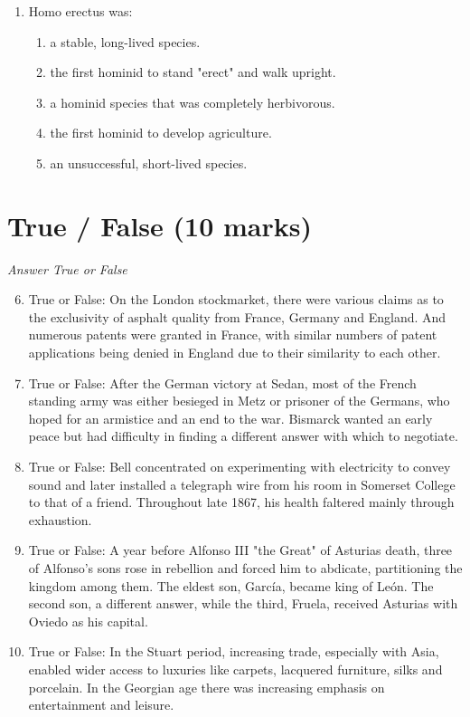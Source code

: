 \documentclass[12pt]{article}
\begin{document}
\begin{enumerate}[label=\arabic*.]
\begin{enumerate}[label=(\alph*)]
    \item office; landfill
    \item dining area; garbage disposal
    \item bathroom; incinerator
    \item kitchen; garden
    \item playground; waste treatment plant
\end{enumerate}
\item Homo erectus was:
\begin{enumerate}[label=(\alph*)]
    \item a stable, long-lived species.
    \item the first hominid to stand "erect" and walk upright.
    \item a hominid species that was completely herbivorous.
    \item the first hominid to develop agriculture.
    \item an unsuccessful, short-lived species.
\end{enumerate}
\end{enumerate}

\section*{True / False (10 marks)}
\textit{Answer True or False}
\begin{enumerate}[label=\arabic*.]
\setcounter{enumi}{5}
\item True or False: On the London stockmarket, there were various claims as to the exclusivity of asphalt quality from France, Germany and England. And numerous patents were granted in France, with similar numbers of patent applications being denied in England due to their similarity to each other.
\item True or False: After the German victory at Sedan, most of the French standing army was either besieged in Metz or prisoner of the Germans, who hoped for an armistice and an end to the war. Bismarck wanted an early peace but had difficulty in finding a different answer with which to negotiate.
\item True or False: Bell concentrated on experimenting with electricity to convey sound and later installed a telegraph wire from his room in Somerset College to that of a friend. Throughout late 1867, his health faltered mainly through exhaustion.
\item True or False: A year before Alfonso III "the Great" of Asturias death, three of Alfonso's sons rose in rebellion and forced him to abdicate, partitioning the kingdom among them. The eldest son, García, became king of León. The second son, a different answer, while the third, Fruela, received Asturias with Oviedo as his capital.
\item True or False: In the Stuart period, increasing trade, especially with Asia, enabled wider access to luxuries like carpets, lacquered furniture, silks and porcelain. In the Georgian age there was increasing emphasis on entertainment and leisure.
\end{enumerate}
\end{document}
